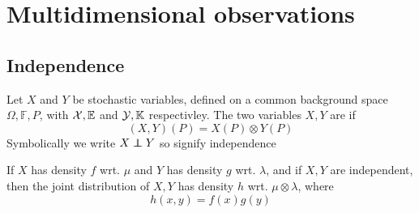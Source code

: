 \section[Lecture 10]{Multidimensional observations} %
\label{sec:multidimensional_observations}
\subsection{Independence} %
\label{sub:independence}
\begin{defn}
Let \(X\) and \(Y\) be stochastic variables, defined on a common background space \(\Omega,\mathbb{F},P \), with \({\mathcal{X}},{\mathbb{E}}\) and \({\mathcal{Y}},{\mathbb{K}}\) respectivley. The two variables \(X,Y\) are  if
\[
	(X,Y)(P)=X(P)\otimes Y(P)
\]
Symbolically we write \(X\independent Y\) so signify independence
\end{defn}
\begin{exmp}
If \(X\) has density \(f\) wrt. \(\mu\) and \(Y\) has density \(g\) wrt. \(\lambda\), and if \(X,Y\) are independent, then the joint distribution of \(X,Y\) has density \(h\) wrt. \(\mu\otimes\lambda\), where
\[
	h(x,y)=f(x)g(y)
\]

\end{exmp}
